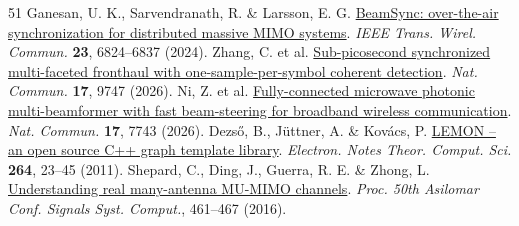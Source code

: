 \begin{thebibliography}{51}
 Ganesan, U. K., Sarvendranath, R. \& Larsson, E. G. \href{https://doi.org/10.1109/TWC.2023.3335089}{BeamSync: over-the-air synchronization for distributed massive MIMO systems}. \emph{IEEE Trans. Wirel. Commun.} \textbf{23}, 6824–6837 (2024).
 Zhang, C. et al. \href{https://doi.org/10.1038/s41467-026-76739-2}{Sub-picosecond synchronized multi-faceted fronthaul with one-sample-per-symbol coherent detection}. \emph{Nat. Commun.} \textbf{17}, 9747 (2026).
 Ni, Z. et al. \href{https://doi.org/10.1038/s41467-026-74485-z}{Fully-connected microwave photonic multi-beamformer with fast beam-steering for broadband wireless communication}. \emph{Nat. Commun.} \textbf{17}, 7743 (2026).
 Dezső, B., Jüttner, A. \& Kovács, P. \href{https://doi.org/10.1016/j.entcs.2011.06.003}{LEMON – an open source C++ graph template library}. \emph{Electron. Notes Theor. Comput. Sci.} \textbf{264}, 23–45 (2011).
 Shepard, C., Ding, J., Guerra, R. E. \& Zhong, L. \href{https://doi.org/10.1109/ACSSC.2016.7869082}{Understanding real many-antenna MU-MIMO channels}. \emph{Proc. 50th Asilomar Conf. Signals Syst. Comput.}, 461–467 (2016).
\end{thebibliography}
